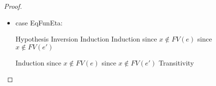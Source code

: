 \begin{proof}
\begin{itemize}
  \begin{eqnproof}[\interpE{\judgeE{\Gamma}{(\fun{x}{A}{e})\;e'}{B}}\;\theta\;\gamma = ]
          {Semantics}
          {Semantics}
          {Functions}
          {Substitution}
  \end{eqnproof}

\item case EqFunEta: 

  \begin{eqnproof}
           {Hypothesis}
              {Inversion}
              {Induction}
              {Induction}
              {since $x\not \in FV(e)$}
              {since $x\not \in FV(e')$}
  \end{eqnproof}
  \begin{eqnproof}
          {Induction}
          {since $x\not \in FV(e)$}
          {since $x\not \in FV(e')$}
          {Transitivity}
  \end{eqnproof}


\end{itemize}
\end{proof}
